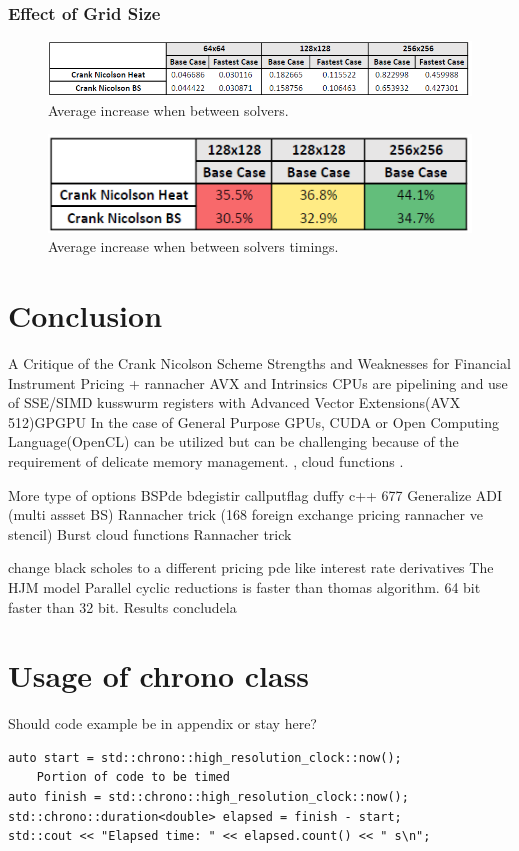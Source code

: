 \documentclass[12pt, oneside]{book}
\theoremstyle{plain}
\theoremstyle{definition}
\begin{document}
\subsection{Effect of Grid Size} 
 \begin{figure}[!htb]
    \centering
        \includegraphics[scale=0.7]{gridTime.png}
    \caption{Average increase when between solvers.}
\end{figure}
\begin{figure}[!htb]
    \centering
        \includegraphics[scale=0.6]{gridTimePercent.png}
    \caption{Average increase when between solvers timings.}
\end{figure}
\chapter{Conclusion}
A Critique of the Crank Nicolson Scheme Strengths and Weaknesses for Financial Instrument Pricing + rannacher 
AVX and Intrinsics CPUs are pipelining and use of SSE/SIMD kusswurm registers with Advanced Vector Extensions(AVX 512)GPGPU In the case of General Purpose GPUs, CUDA or Open Computing Language(OpenCL) can be utilized but can be challenging because of the requirement of delicate memory management. \cite{fpga},  cloud functions \cite{cloudfunc}.

More type of options BSPde bdegistir callputflag duffy c++ 677 
Generalize ADI (multi assset BS)
Rannacher trick (168 foreign exchange pricing rannacher ve stencil)
Burst cloud functions
Rannacher trick

change black scholes to a different pricing pde like interest rate derivatives The HJM model \cite{kohl}
Parallel cyclic reductions is faster than thomas algorithm. 64 bit faster than 32 bit. 
Results concludela

\appendix
\chapter{Usage of chrono class}
Should code example be in appendix or stay here?
\begin{verbatim}
auto start = std::chrono::high_resolution_clock::now();
    Portion of code to be timed
auto finish = std::chrono::high_resolution_clock::now();
std::chrono::duration<double> elapsed = finish - start;
std::cout << "Elapsed time: " << elapsed.count() << " s\n";
\end{verbatim}
\end{document}

